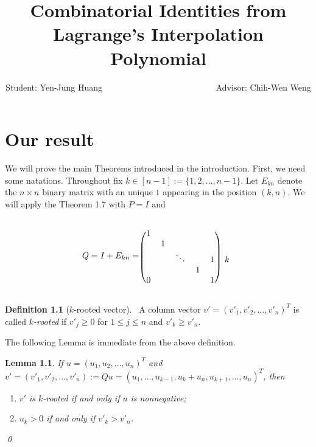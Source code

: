 \documentclass[12pt]{report}
\title{Combinatorial Identities from Lagrange's Interpolation Polynomial}
\author{Student: Yen-Jung Huang  ~~~~~~~~~~~~~~~~~~~~~~~~~~Advisor: Chih-Wen Weng}
\date{} %
\theoremstyle{plain}
\newtheorem{lem}[thm]{Lemma}
\theoremstyle{definition}
\newtheorem{defn}[thm]{Definition}
\begin{document}
\chapter{Our result}
We will prove the main Theorems introduced in the introduction. First, we need some natations.
 Throughout fix $k \in [n-1] := \{1,2,...,n-1\}$. Let $E_{kn}$ denote the $n\times n$ binary matrix with an unique $1$ appearing in the  position $(k,n)$. We will apply the Theorem 1.7 with $P=I$ and 



\begin{equation}
Q=I+E_{kn}=\begin{blockarray}{cccccc}
 &  &  & &  \\
\begin{block}{(ccccc)c}
	\label{Q1}
  1 &   &   &   &   &  \\
    & 1 &   &   &   &  \\
    &   & \ddots &   & 1 & k \\
    &   &   & 1 &   &  \\
  0 &   &   &   & 1 &  \\
\end{block}
\end{blockarray}
\end{equation}


\begin{defn}[$k$-rooted vector]%
 ~A column vector $v'=(v'_1,v'_2,\ldots,v'_n)^T$ is called {\it $k$-rooted}  if $v'_{j} \geq 0$ for $1 \leq  j \leq n$ and $v'_k\geq v'_n.$
\end{defn}
\bigskip

The following Lemma is immediate from the above definition.
\bigskip

\begin{lem}
If $u=(u_1, u_2, \ldots, u_n)^T$ and $v'=(v'_1, v'_2, \ldots, v'_n):=Qu=(u_1,\ldots, u_{k-1},u_k+u_n, u_{k+1}, \ldots,  u_n)^T$, then
\begin{enumerate}
\item[(i)] $v'$ is $k$-rooted  if and only if  $u$ is nonnegative;
\item[(ii)] $u_k>0$ if and only if $v'_k>v'_n$.
\end{enumerate}
\qed
\end{lem}
\end{document}
